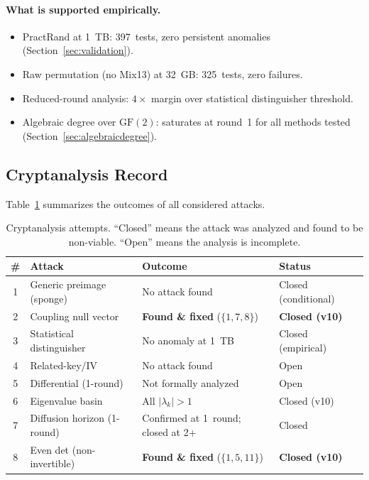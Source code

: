 \documentclass[runningheads]{llncs}
\begin{document}
\paragraph{What is supported empirically.}
\begin{itemize}[nosep]
\item PractRand at 1~TB: 397~tests, zero persistent anomalies (Section~\ref{sec:validation}).
\item Raw permutation (no Mix13) at 32~GB: 325~tests, zero failures.
\item Reduced-round analysis: $4\times$ margin over statistical distinguisher threshold.
\item Algebraic degree over $\mathrm{GF}(2)$: saturates at round~1 for all methods
  tested (Section~\ref{sec:algebraicdegree}).
\end{itemize}

\subsection{Cryptanalysis Record}

Table~\ref{tab:attacks} summarizes the outcomes of all considered attacks.

\begin{table}[h]
\centering
\caption{Cryptanalysis attempts.  ``Closed'' means the attack was analyzed and
found to be non-viable.  ``Open'' means the analysis is incomplete.}
\label{tab:attacks}
\small
\begin{tabular}{@{}clll@{}}
\toprule
\# & Attack & Outcome & Status \\
\midrule
1 & Generic preimage (sponge) & No attack found & Closed (conditional) \\
2 & Coupling null vector & \textbf{Found \& fixed} ($\{1,7,8\}$) & \textbf{Closed (v10)} \\
3 & Statistical distinguisher & No anomaly at 1~TB & Closed (empirical) \\
4 & Related-key/IV & No attack found & Open \\
5 & Differential (1-round) & Not formally analyzed & Open \\
6 & Eigenvalue basin & All $|\lambda_k| > 1$ & Closed (v10) \\
7 & Diffusion horizon (1-round) & Confirmed at 1~round; closed at 2+ & Closed \\
8 & Even det (non-invertible) & \textbf{Found \& fixed} ($\{1,5,11\}$) & \textbf{Closed (v10)} \\
\bottomrule
\end{tabular}
\end{table}
\end{document}
